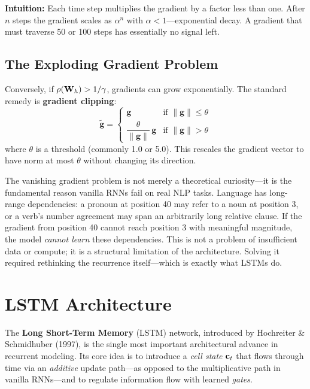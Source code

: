 \textbf{Intuition:} Each time step multiplies the gradient by a factor
less than one.  After $n$ steps the gradient scales as $\alpha^n$ with
$\alpha < 1$---exponential decay.  A gradient that must traverse 50 or 100
steps has essentially no signal left.

\subsection{The Exploding Gradient Problem}

Conversely, if $\rho(\mathbf{W}_h) > 1/\gamma$, gradients can grow
exponentially.  The standard remedy is \textbf{gradient clipping}:
\begin{equation}
\tilde{\mathbf{g}} = \begin{cases}
\mathbf{g} & \text{if } \lVert \mathbf{g} \rVert \leq \theta \\[4pt]
\dfrac{\theta}{\lVert \mathbf{g} \rVert} \, \mathbf{g}
  & \text{if } \lVert \mathbf{g} \rVert > \theta
\end{cases}
\end{equation}
where $\theta$ is a threshold (commonly 1.0 or 5.0).  This rescales the
gradient vector to have norm at most $\theta$ without changing its direction.

\begin{keyinsight}
The vanishing gradient problem is not merely a theoretical curiosity---it is
the fundamental reason vanilla RNNs fail on real NLP tasks.  Language has
long-range dependencies: a pronoun at position 40 may refer to a noun at
position 3, or a verb's number agreement may span an arbitrarily long
relative clause.  If the gradient from position 40 cannot reach position 3
with meaningful magnitude, the model \emph{cannot learn} these dependencies.
This is not a problem of insufficient data or compute; it is a structural
limitation of the architecture.  Solving it required rethinking the
recurrence itself---which is exactly what LSTMs do.
\end{keyinsight}


\section{LSTM Architecture}
\label{sec:lstm}

The \textbf{Long Short-Term Memory} (LSTM) network, introduced by Hochreiter
\& Schmidhuber (1997), is the single most important architectural advance in
recurrent modeling.  Its core idea is to introduce a \emph{cell state}
$\mathbf{c}_t$ that flows through time via an \emph{additive} update path---as
opposed to the multiplicative path in vanilla RNNs---and to regulate
information flow with learned \emph{gates}.

